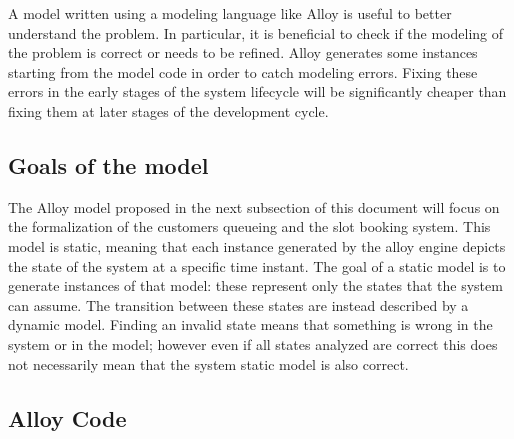 A model written using a modeling language like Alloy is useful to better understand the problem. In particular, it is beneficial to check if the modeling of the problem is correct or needs to be refined. Alloy generates some instances starting from the model code in order to catch modeling errors. Fixing these errors in the early stages of the system lifecycle will be significantly cheaper than fixing them at later stages of the development cycle.

\subsection{Goals of the model}
The Alloy model proposed in the next subsection of this document will focus on the formalization of the customers queueing and the slot booking system. This model is static, meaning that each instance generated by the alloy engine depicts the state of the system at a specific time instant. The goal of a static model is to generate instances of that model: these represent only the states that the system can assume. The transition between these states are instead described by a dynamic model. Finding an invalid state means that something is wrong in the system or in the model; however even if all states analyzed are correct this does not necessarily mean that the system static model is also correct.
\subsection{Alloy Code}


\clearpage
